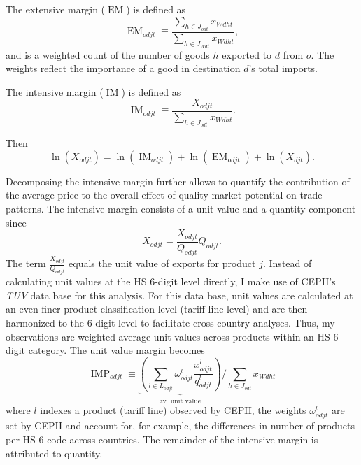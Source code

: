 \documentclass[12pt,a4paper,oneside,times]{article}   	%
\DeclareMathOperator{\IM}{IM}
\DeclareMathOperator{\IMP}{IMP}
\DeclareMathOperator{\EM}{EM}
\begin{document}
The extensive margin ($\EM$) is defined as
\begin{equation}\label{eq: def EM}
\EM_{odjt}  \equiv \frac{\sum_{h \in J_{odt}} x_{Wdht}}{\sum_{h \in J_{Wdt}} x_{Wdht}},
\end{equation}
and is a weighted count of the number of goods $h$ exported to $d$ from $o$. The weights reflect the importance of a good in destination $d$'s total imports. 

The intensive margin ($\IM$) is defined as
\begin{equation}\label{eq: def IM}
\IM_{odjt}  \equiv \frac{ X_{odjt}}{\sum_{h \in J_{odt}} x_{Wdht}}.
\end{equation}

Then 
\begin{equation}\label{eq: simple IM decomp}
\ln(X_{odjt}) =  \ln(\IM_{odjt}) + \ln(\EM_{odjt}) + \ln(X_{djt}).
\end{equation}

Decomposing the intensive margin further allows to quantify the contribution of the average price to the overall effect of quality market potential on trade patterns. The intensive margin consists of a unit value and a quantity component since
\begin{equation}
 X_{odjt} =  \frac{X_{odjt}}{Q_{odjt}} Q_{odjt}.
\end{equation} 
The term $\frac{X_{odjt}}{Q_{odjt}}$ equals the unit value of exports for product $j$. Instead of calculating unit values at the HS 6-digit level directly, I make use of CEPII's \emph{TUV} data base for this analysis. For this data base, unit values are calculated at an even finer product classification level (tariff line level) and are then harmonized to the 6-digit level to facilitate cross-country analyses. Thus, my observations are weighted average unit values across products within an HS 6-digit category. The unit value margin becomes
\begin{equation}\label{eq: def IM decomp}
 \IMP_{odjt}  \equiv \underbrace{\left(\sum_{l \in L_{odjt}} \omega^l_{odjt}\frac{x^l_{odjt}}{q^l_{odjt}} \right)}_{\text{av. unit value}} /\sum_{h \in J_{odt}} x_{Wdht}
\end{equation}
where $l$ indexes a product (tariff line) observed by CEPII,  the weights $\omega^l_{odjt}$ are set by CEPII and account for, for example, the differences in number of products per HS 6-code across countries. The remainder of the intensive margin is attributed to quantity. 
\end{document}
